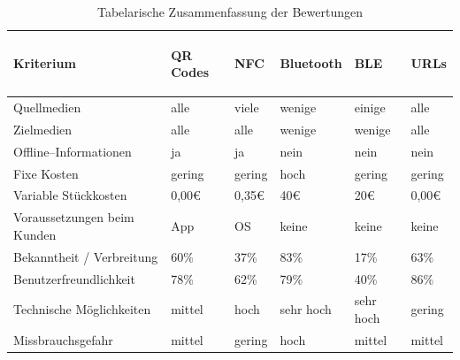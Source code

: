 \begin{table}[H]
\begin{center}
\begin{footnotesize}
\begin{tabular}{| l | C{1cm} | C{1cm} | C{1cm} | C{1cm} | C{1cm} |}  \hline                       
  \textbf{Kriterium} & 
	\begin{turn}{90}\textbf{QR Codes\vspace{0.1cm}}\end{turn} & 
	\begin{turn}{90}\textbf{NFC}\end{turn}  & 
	\begin{turn}{90}\textbf{Bluetooth}\end{turn} & 
	\begin{turn}{90}\textbf{BLE}\end{turn} & 
	\begin{turn}{90}\textbf{URLs}\end{turn}\\ \hline 
	Quellmedien					& alle   & viele   & wenige & einige   & alle \\  \hline  
	Zielmedien  				& alle   & alle    & wenige & wenige   & alle \\  \hline  
	Offline–Informationen 		& ja     & ja      & nein   & nein     & nein \\  \hline  
	Fixe Kosten 				& gering & gering  & hoch   & gering   & gering \\  \hline  
	Variable Stückkosten		& 0,00€  & 0,35€ & 40€  & 20€ & 0,00€ \\  \hline  
	Voraussetzungen beim Kunden & App    & OS      & keine  & keine    & keine \\  \hline  
	Bekanntheit / Verbreitung	& 60\%   & 37\%    & 83\%   & 17\%     & 63\% \\  \hline  
	Benutzerfreundlichkeit 		& 78\%   & 62\%    & 79\%   & 40\%     & 86\% \\  \hline  
	Technische Möglichkeiten   & mittel & hoch    & sehr hoch & sehr hoch & gering \\ \hline
	Missbrauchsgefahr 			& mittel & gering  & hoch   & mittel   & mittel \\  \hline  
			   
\end{tabular}
\end{footnotesize}
\caption{Tabelarische Zusammenfassung der Bewertungen}
\label{tab:zusammenfassung}
\end{center}
\end{table}

